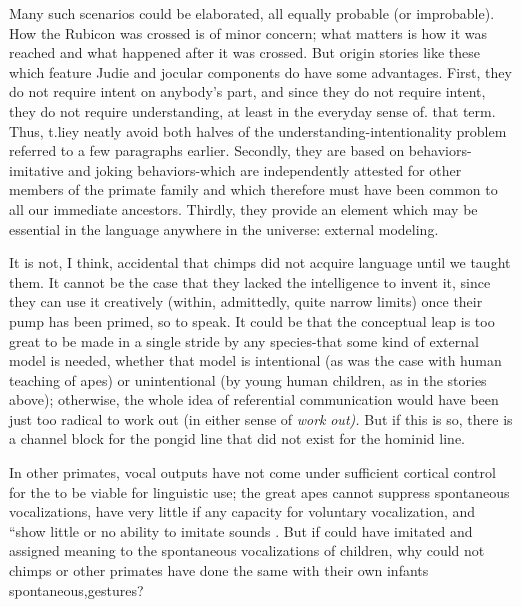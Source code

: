 
Many such scenarios could be elaborated, all equally probable (or improbable). How the Rubicon was crossed is of minor concern; what matters is how it was reached and what happened after it was crossed. But origin stories like these which feature Judie and jocular compo\-nents do have some advantages. First, they do not require intent on anybody's part, and since they do not require intent, they do not require understanding, at least in the everyday sense of. that term. Thus, t.liey neatly avoid both halves of the understanding-intentionality problem referred to a few paragraphs earlier. Secondly, they are based on behaviors- imitative and joking behaviors-which are independently attested for other members of the primate family and which therefore must have been common to all our immediate ancestors. Thirdly, they provide an element which may be essential in the  lan\-guage anywhere in the universe: external modeling.

It is not, I think, accidental that chimps did not acquire language until we taught them. It cannot be the case that they lacked the intelli\-gence to invent it, since they can use it creatively (within, admittedly, quite narrow limits) once their pump has been primed, so to speak. It could be that the conceptual leap is too great to be made in a single stride by any species-that some kind of external model is needed, whether that model is intentional (as was the case with human teaching of apes) or unintentional (by young human children, as in the stories above); otherwise, the whole idea of referential communication would have been just too radical to work out (in either sense of \textit{work} \textit{out}\textit{).} But if this is so, there is a channel block for the pongid line that did not exist for the hominid line.

In other primates, vocal outputs have not come under sufficient cortical control for the  to be viable for linguistic use; the great apes cannot suppress spontaneous vocalizations, have very little if any capacity for voluntary vocalization, and ``show little or no ability to imitate sounds \citep{Dingwall1979}. But if  could have imitated and assigned meaning to the spontaneous vocalizations of children, why could not chimps or other primates have done the same with their own infants spontaneous,gestures?


